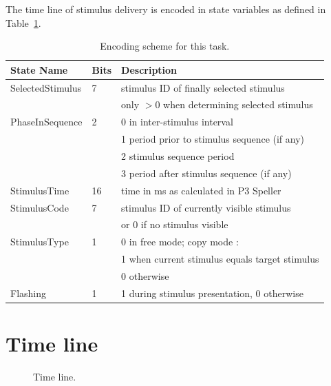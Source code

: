 \documentclass[letterpaper,oneside,12pt]{article}
\begin{document}
The time line of stimulus delivery is encoded in state variables as defined in
Table~\ref{tab:states}.
\begin{table}
\begin{center}
\begin{tabular}[ht]{|l|l|l|}
\hline
\bf{State Name}& \bf{Bits}            & \bf{Description} \\
\hline
\hline
 SelectedStimulus & 7 & stimulus ID of finally selected stimulus \\
                  &   & only $>$0 when determining selected stimulus\\
\hline
 PhaseInSequence  & 2 & 0 in inter-stimulus interval\\
                  &   & 1 period prior to stimulus sequence (if any)\\
                  &   & 2 stimulus sequence period\\
                  &   & 3 period after stimulus sequence (if any)\\
\hline
 StimulusTime     & 16& time in ms as calculated in P3 Speller\\
\hline
 StimulusCode     & 7 & stimulus ID of currently visible stimulus\\
                  &   & or 0 if no stimulus visible\\
\hline
 StimulusType     & 1 & 0 in free mode; copy mode :\\
                  &   & 1 when current stimulus equals target stimulus\\
                  &   & 0 otherwise\\
\hline
 Flashing         & 1 & 1 during stimulus presentation, 0 otherwise\\
\hline
\end{tabular}
\caption{Encoding scheme for this task.}
\label{tab:states}
\end{center}
\end{table}

\section{Time line}

\begin{figure}[ht]
 \centerline{}
 \caption{Time line.}
 \label{fig:timeline}
\end{figure}

\end{document}
